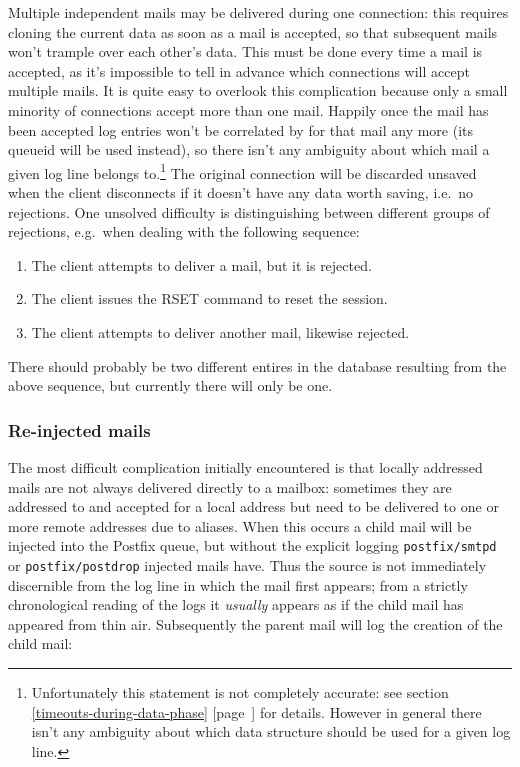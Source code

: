 \documentclass[a4paper,12pt,draft]{article}
\newcommand{\refwithpage}[1]{%
    \empty{}\ref{#1} [page~\pageref{#1}]%
}
\newcommand{\daemon}[1]{%
    \texttt{postfix/#1}%
}
\begin{document}
Multiple independent mails may be delivered during one connection: this
requires cloning the current data as soon as a mail is accepted, so that
subsequent mails won't trample over each other's data.  This must be done
every time a mail is accepted, as it's impossible to tell in advance which
connections will accept multiple mails.  It is quite easy to overlook this
complication because only a small minority of connections accept more than
one mail. Happily once the mail has been accepted log entries won't be
correlated by \pid{} for that mail any more (its queueid will be used
instead), so there isn't any ambiguity about which mail a given log line
belongs to.\footnote{Unfortunately this statement is not completely
accurate: see section~\refwithpage{timeouts-during-data-phase} for details.
However in general there isn't any ambiguity about which data structure
should be used for a given log line.}  The original connection will be
discarded unsaved when the client disconnects if it doesn't have any data
worth saving, i.e.\ no rejections.  One unsolved difficulty is
distinguishing between different groups of rejections, e.g.\ when dealing
with the following sequence:

\begin{enumerate}

    \item The client attempts to deliver a mail, but it is rejected.

    \item The client issues the RSET command to reset the session.

    \item The client attempts to deliver another mail, likewise rejected.

\end{enumerate}

There should probably be two different entires in the database resulting
from the above sequence, but currently there will only be one.



\subsubsection{Re-injected mails}

The most difficult complication initially encountered is that locally
addressed mails are not always delivered directly to a mailbox: sometimes
they are addressed to and accepted for a local address but need to be
delivered to one or more remote addresses due to aliases.  When this occurs
a child mail will be injected into the Postfix queue, but without the
explicit logging \daemon{smtpd} or \daemon{postdrop} injected mails have.
Thus the source is not immediately discernible from the log line in which
the mail first appears; from a strictly chronological reading of the logs
it \textit{usually\/} appears as if the child mail has appeared from thin
air.  Subsequently the parent mail will log the creation of the child mail:
\end{document}
